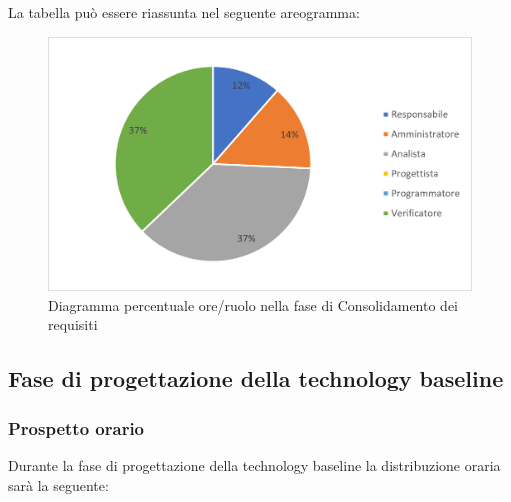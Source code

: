 La tabella può essere riassunta nel seguente areogramma:
\begin{figure}[H]
	\centering
	\includegraphics[width=0.8\linewidth]{res/images/preventivo/2-2.png}
	\caption{Diagramma percentuale ore/ruolo nella fase di Consolidamento dei requisiti}
	\label{fig:diagramma costi ruolo fase consolidamento dei requisiti}
\end{figure}

\subsection{Fase di progettazione della technology baseline}
\subsubsection{Prospetto orario}
Durante la fase di progettazione della technology baseline la distribuzione oraria sarà la seguente:

